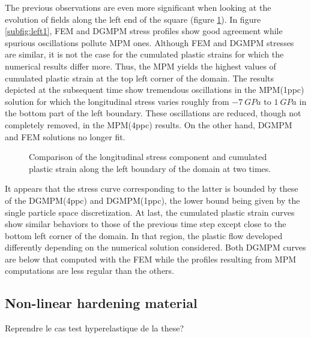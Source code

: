 The previous observations are even more significant when looking at the evolution of fields along the left end of the square (figure \ref{fig:left_line}).
In figure \ref{subfig:left1}, FEM and DGMPM stress profiles show good agreement while spurious oscillations pollute MPM ones. 
Although FEM and DGMPM stresses are similar, it is not the case for the cumulated plastic strains for which the numerical results differ more.
Thus, the MPM yields the highest values of cumulated plastic strain at the top left corner of the domain.
The results depicted at the subsequent time show tremendous oscillations in the MPM(1ppc) solution for which the longitudinal stress varies roughly from $-7 \: GPa$ to $1 \: GPa$ in the bottom part of the left boundary.
These oscillations are reduced, though not completely removed, in the MPM(4ppc) results. 
On the other hand, DGMPM and FEM solutions no longer fit.
\begin{figure}[ht]
  \centering
  {}
  {}
  
  \caption{Comparison of the longitudinal stress component and cumulated plastic strain along the left boundary of the domain at two times.}
  \label{fig:left_line}
\end{figure}
It appears that the stress curve corresponding to the latter is bounded by these of the DGMPM(4ppc) and DGMPM(1ppc), the lower bound being given by the single particle space discretization.
At last, the cumulated plastic strain curves show similar behaviors to those of the previous time step except close to the bottom left corner of the domain.
In that region, the plastic flow developed differently depending on the numerical solution considered.
Both DGMPM curves are below that computed with the FEM while the profiles resulting from MPM computations are less regular than the others.

\subsection{Non-linear hardening material}
\label{sec:non-linear-hardening}
Reprendre le cas test hyperelastique de la these?


